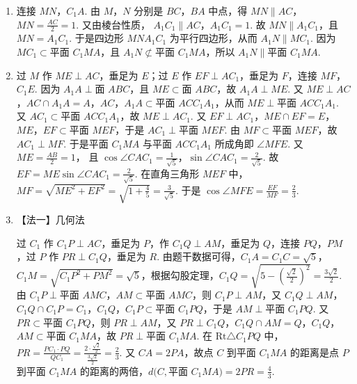 \begin{solution}
\begin{enumerate}
\item 连接 \(MN\)，\(C_1A\). 由 \(M\)，\(N\) 分别是 \(BC\)，\(BA\) 中点，得
\(MN\parallel AC\)，\(MN=\frac{AC}{2}=1\).
又由棱台性质，
\(A_1C_1\parallel AC\)，\(A_1C_1=1\).
故 \(MN\parallel A_1C_1\)，且 \(MN=A_1C_1\). 于是四边形 \(MNA_1C_1\) 为平行四边形，从而 \(A_1N\parallel MC_1\). 因为 \(MC_1\subset \text{平面 }C_1MA\)，且 \(A_1N\not\subset \text{平面 }C_1MA\)，所以 \(A_1N\parallel \text{平面 }C_1MA\).

\item 过 \(M\) 作 \(ME\perp AC\)，垂足为 \(E\)；过 \(E\) 作 \(EF\perp AC_1\)，垂足为 \(F\)，连接 \(MF\)，\(C_1E\).
因为 \(A_1A\perp \text{面 }ABC\)，且 \(ME\subset \text{面 }ABC\)，故 \(A_1A\perp ME\). 又 \(ME\perp AC\)，\(AC\cap A_1A=A\)，\(AC\)，\(A_1A\subset \text{平面 }ACC_1A_1\)，从而
\(ME\perp \text{平面 }ACC_1A_1\).
又 \(AC_1\subset \text{平面 }ACC_1A_1\)，故 \(ME\perp AC_1\). 又 \(EF\perp AC_1\)，\(ME\cap EF=E\)，\(ME\)，\(EF\subset \text{平面 }MEF\)，于是 \(AC_1\perp \text{平面 }MEF\).
由 \(MF\subset \text{平面 }MEF\)，故 \(AC_1\perp MF\). 于是平面 \(C_1MA\) 与平面 \(ACC_1A_1\) 所成角即 \(\angle MFE\).
又
\(ME=\frac{AB}{2}=1\)，
且 \(\cos \angle CAC_1=\frac{1}{\sqrt5}\)，\(\sin \angle CAC_1=\frac{2}{\sqrt5}\).
故
\(EF=ME\sin \angle CAC_1=\frac{2}{\sqrt5}\).
在直角三角形 \(MEF\) 中，
\(MF=\sqrt{ME^2+EF^2}=\sqrt{1+\frac{4}{5}}=\frac{3}{\sqrt5}\).
于是
\(\cos \angle MFE=\frac{EF}{MF}=\frac{2}{3}\).

\item 【法一】几何法

过 \(C_1\) 作 \(C_1P\perp AC\)，垂足为 \(P\)，作 \(C_1Q\perp AM\)，垂足为 \(Q\)，连接 \(PQ\)，\(PM\)，过 \(P\) 作 \(PR\perp C_1Q\)，垂足为 \(R\).
由题干数据可得，\(C_1A=C_1C=\sqrt5\)，\(C_1M=\sqrt{C_1P^2+PM^2}=\sqrt5\)，根据勾股定理，\(C_1Q=\sqrt{5-\left( \frac{\sqrt2}{2} \right)^2}=\frac{3\sqrt2}{2}\).
由 \(C_1P\perp \text{平面 }AMC\)，\(AM\subset \text{平面 }AMC\)，则 \(C_1P\perp AM\)，又 \(C_1Q\perp AM\)，\(C_1Q\cap C_1P=C_1\)，\(C_1Q\)，\(C_1P\subset \text{平面 }C_1PQ\)，于是 \(AM\perp \text{平面 }C_1PQ\).
又 \(PR\subset \text{平面 }C_1PQ\)，则 \(PR\perp AM\)，又 \(PR\perp C_1Q\)，\(C_1Q\cap AM=Q\)，\(C_1Q\)，\(AM\subset \text{平面 }C_1MA\)，故 \(PR\perp \text{平面 }C_1MA\).
在 \(\mathrm{Rt}\triangle C_1PQ\) 中，\(PR=\frac{PC_1\cdot PQ}{QC_1}=\frac{2\cdot \frac{\sqrt2}{2}}{\frac{3\sqrt2}{2}}=\frac{2}{3}\).
又 \(CA=2PA\)，故点 \(C\) 到平面 \(C_1MA\) 的距离是点 \(P\) 到平面 \(C_1MA\) 的距离的两倍，\(d\bigl(C,\text{平面 }C_1MA\bigr)=2PR=\frac{4}{3}\).


\end{enumerate}
\end{solution}
